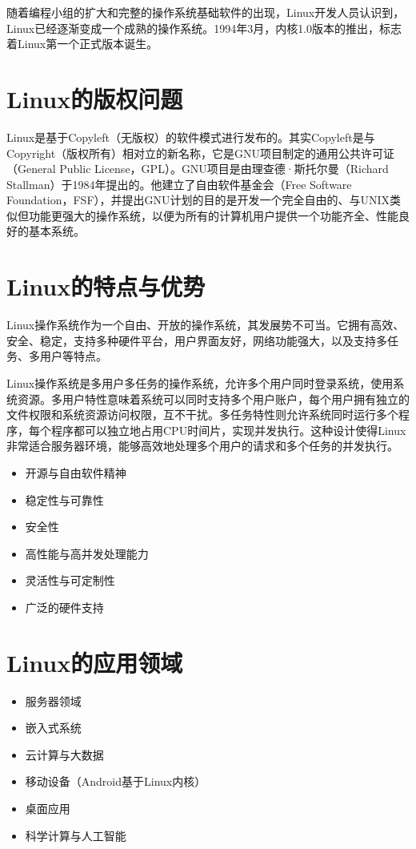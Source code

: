 \documentclass[12pt,UTF8]{ctexbook}
\begin{document}
随着编程小组的扩大和完整的操作系统基础软件的出现，Linux开发人员认识到，Linux已经逐渐变成一个成熟的操作系统。1994年3月，内核1.0版本的推出，标志着Linux第一个正式版本诞生。

\section{Linux的版权问题}
Linux是基于Copyleft（无版权）的软件模式进行发布的。其实Copyleft是与Copyright（版权所有）相对立的新名称，它是GNU项目制定的通用公共许可证（General Public License，GPL）。GNU项目是由理查德·斯托尔曼（Richard Stallman）于1984年提出的。他建立了自由软件基金会（Free Software Foundation，FSF），并提出GNU计划的目的是开发一个完全自由的、与UNIX类似但功能更强大的操作系统，以便为所有的计算机用户提供一个功能齐全、性能良好的基本系统。

\section{Linux的特点与优势}
Linux操作系统作为一个自由、开放的操作系统，其发展势不可当。它拥有高效、安全、稳定，支持多种硬件平台，用户界面友好，网络功能强大，以及支持多任务、多用户等特点。

Linux操作系统是多用户多任务的操作系统，允许多个用户同时登录系统，使用系统资源。多用户特性意味着系统可以同时支持多个用户账户，每个用户拥有独立的文件权限和系统资源访问权限，互不干扰。多任务特性则允许系统同时运行多个程序，每个程序都可以独立地占用CPU时间片，实现并发执行。这种设计使得Linux非常适合服务器环境，能够高效地处理多个用户的请求和多个任务的并发执行。

\begin{itemize}
    \item 开源与自由软件精神
    \item 稳定性与可靠性
    \item 安全性
    \item 高性能与高并发处理能力
    \item 灵活性与可定制性
    \item 广泛的硬件支持
\end{itemize}

\section{Linux的应用领域}
\begin{itemize}
    \item 服务器领域
    \item 嵌入式系统
    \item 云计算与大数据
    \item 移动设备（Android基于Linux内核）
    \item 桌面应用
    \item 科学计算与人工智能
\end{itemize}
\end{document}
